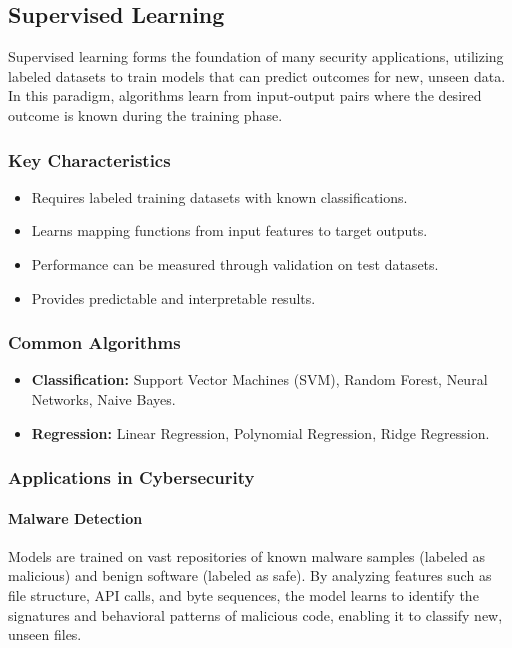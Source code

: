 \documentclass[16pt]{report}
\begin{document}
\subsection{Supervised Learning}
Supervised learning forms the foundation of many security applications, utilizing labeled datasets to train models that can predict outcomes for new, unseen data. In this paradigm, algorithms learn from input-output pairs where the desired outcome is known during the training phase.

\subsubsection{Key Characteristics}
\begin{itemize}
    \item Requires labeled training datasets with known classifications.
    \item Learns mapping functions from input features to target outputs.
    \item Performance can be measured through validation on test datasets.
    \item Provides predictable and interpretable results.
\end{itemize}

\subsubsection{Common Algorithms}
\begin{itemize}
    \item \textbf{Classification:} Support Vector Machines (SVM), Random Forest, Neural Networks, Naive Bayes.
    \item \textbf{Regression:} Linear Regression, Polynomial Regression, Ridge Regression.
\end{itemize}

\subsubsection{Applications in Cybersecurity}
\paragraph{Malware Detection}
Models are trained on vast repositories of known malware samples (labeled as malicious) and benign software (labeled as safe). By analyzing features such as file structure, API calls, and byte sequences, the model learns to identify the signatures and behavioral patterns of malicious code, enabling it to classify new, unseen files.
\end{document}
